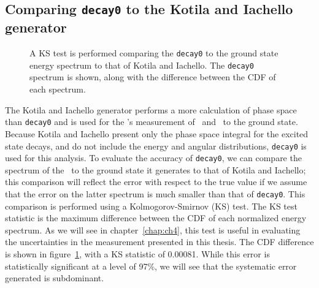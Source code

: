 \documentclass[/main.tex]{subfiles}
\begin{document}
\subsection{Comparing \texttt{decay0} to the Kotila and Iachello generator}
\begin{figure}
  \centering
  \caption[KS test comparing \texttt{decay0} to Kotila and Iachello \tnbb to g.s. spectra]{\label{fig:kstest}
    A KS test is performed comparing the \texttt{decay0} \tnbb to the ground state energy spectrum to that of Kotila and Iachello. The \texttt{decay0} spectrum is shown, along with the difference between the CDF of each spectrum.
  }
\end{figure}
The Kotila and Iachello generator performs a more calculation of phase space than \texttt{decay0} and is used for the \MJD 's measurement of \tnbb\ and \znbb\ to the ground state.
Because Kotila and Iachello present only the phase space integral for the excited state decays, and do not include the energy and angular distributions, \texttt{decay0} is used for this analysis.
To evaluate the accuracy of \texttt{decay0}, we can compare the spectrum of the \tnbb\ to the ground state it generates to that of Kotila and Iachello; this comparison will reflect the error with respect to the true value if we assume that the error on the latter spectrum is much smaller than that of \texttt{decay0}.
This comparison is performed using a Kolmogorov-Smirnov (KS) test.
The KS test statistic is the maximum difference between the CDF of each normalized energy spectrum.
As we will see in chapter~\ref{chap:ch4}, this test is useful in evaluating the uncertainties in the measurement presented in this thesis.
The CDF difference is shown in figure~\ref{fig:kstest}, with a KS statistic of 0.00081.
While this error is statistically significant at a level of 97\%, we will see that the systematic error generated is subdominant.
\end{document}
